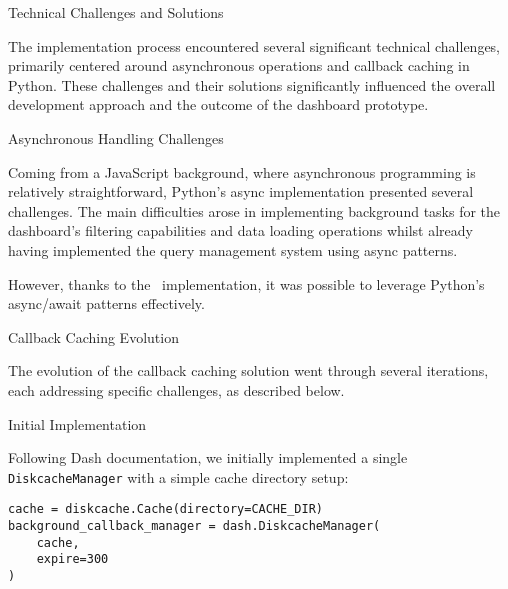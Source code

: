\begin{section}{Technical Challenges and Solutions}
	\label{sec:implementation-technical-challenges}

	The implementation process encountered several significant technical challenges, primarily centered around asynchronous operations and callback caching in Python.
	These challenges and their solutions significantly influenced the overall development approach and the outcome of the dashboard prototype.

	\begin{subsection}{Asynchronous Handling Challenges}
		\label{subsec:implementation-technical-challenges-async}

		Coming from a JavaScript background, where asynchronous programming is relatively straightforward\cite{node.js_asynchronous_work_javascript_asynchronous_programming_and_callbacks}, Python's async implementation presented several challenges.
		The main difficulties arose in implementing background tasks for the dashboard's filtering capabilities and data loading operations whilst already having implemented the query management system using async patterns.

		However, thanks to the~ implementation, it was possible to leverage Python's async/await patterns effectively.
	\end{subsection}

	\begin{subsection}{Callback Caching Evolution}
		\label{subsec:implementation-technical-challenges-caching}

		The evolution of the callback caching solution went through several iterations, each addressing specific challenges, as described below.

		\begin{subsubsection}{Initial Implementation}
			\label{subsubsec:implementation-technical-challenges-caching-initial}

			Following Dash documentation\cite{plotly_dash_plotly_com_background_callbacks}, we initially implemented a single \texttt{DiskcacheManager} with a simple cache directory setup:

			\begin{listing}[H]
				\caption{Initial Cache Manager Setup}
				\begin{verbatim}
cache = diskcache.Cache(directory=CACHE_DIR)
background_callback_manager = dash.DiskcacheManager(
    cache,
    expire=300
)
				\end{verbatim}
				\label{lst:dashboard-implementation-cache-initial}
			\end{listing}


\end{subsubsection}
\end{subsection}
\end{section}
